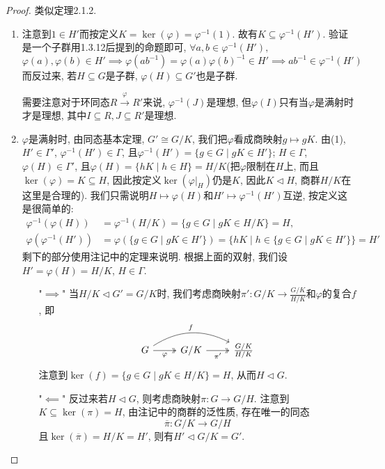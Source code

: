 \documentclass{../solutions-cn}
\begin{document}
\begin{proof}
    类似定理2.1.2.

    \begin{enumerate}[(1)]
        \item 注意到$1 \in H'$而按定义$K = \ker(\varphi) = \varphi^{-1}(1)$. 故有$K \subseteq \varphi^{-1}(H')$. 验证是一个子群用1.3.12后提到的命题即可, $\forall a, b \in \varphi^{-1}(H'),$
        \[
            \varphi(a), \varphi(b) \in H' \implies \varphi(ab^{-1}) = \varphi(a)\varphi(b)^{-1} \in H' \implies ab^{-1} \in \varphi^{-1}(H')
        \]
        而反过来, 若$H \subseteq G$是子群, $\varphi(H) \subseteq G'$也是子群.

        \begin{remark}
            需要注意对于环同态$R \xrightarrow{\varphi} R'$来说, $\varphi^{-1}(J)$是理想, 但$\varphi(I)$只有当$\varphi$是满射时才是理想, 其中$I \subseteq R, J \subseteq R'$是理想.
        \end{remark}
        \item $\varphi$是满射时, 由同态基本定理, $G' \cong G/K$, 我们把$\varphi$看成商映射$g \mapsto gK$. 由(1), $H' \in \Gamma'$, $\varphi^{-1}(H') \in \Gamma$, 且$\varphi^{-1}(H') = \{g \in G \mid gK \in H'\}$; $H \in \Gamma$, $\varphi(H) \in \Gamma'$, 且$\varphi(H) = \{hK \mid h \in H\} = H/K$(把$\varphi$限制在$H$上, 而且$\ker(\varphi) = K \subseteq H$, 因此按定义$\ker(\varphi|_H)$仍是$K$, 因此$K \lhd H$, 商群$H/K$在这里是合理的). 我们只需说明$H \mapsto \varphi(H)$和$H' \mapsto \varphi^{-1}(H')$互逆, 按定义这是很简单的:
        \[
        \begin{aligned}
            \varphi^{-1}(\varphi(H)) &= \varphi^{-1}(H/K) = \{g \in G \mid gK \in H/K\} = H,\\
            \varphi(\varphi^{-1}(H')) &= \varphi(\{g \in G \mid gK \in H'\}) = \{hK \mid h \in \{g \in G \mid gK \in H'\}\} = H'
        \end{aligned}
        \]
        剩下的部分使用注记中的定理来说明. 根据上面的双射, 我们设$H' = \varphi(H) = H/K$, $H \in \Gamma$.
        \begin{enumerate}
            \item["$\implies$"] 当$H/K \lhd G' = G/K$时, 我们考虑商映射$\pi':G/K \to \frac{G/K}{H/K}$和$\varphi$的复合$f$, 即
            \[
                \begin{tikzcd}
                    G \arrow[r, "\varphi"', two heads] \arrow[rr, "f", bend left] & G/K \arrow[r, "\pi'"', two heads] & \frac{G/K}{H/K}
                \end{tikzcd}
            \]
            注意到$\ker(f) = \{g \in G \mid gK \in H/K\} = H$, 从而$H \lhd G$.
            \item["$\impliedby$"] 反过来若$H \lhd G$, 则考虑商映射$\pi:G \to G/H$. 注意到$K \subseteq \ker(\pi) = H$, 由注记中的商群的泛性质, 存在唯一的同态
            \[
                \overline{\pi}:G/K \to G/H
            \]
            且$\ker(\overline{\pi}) = H/K = H'$, 则有$H' \lhd G/K = G'$.
        \end{enumerate}
    \end{enumerate}
\end{proof}
\end{document}
